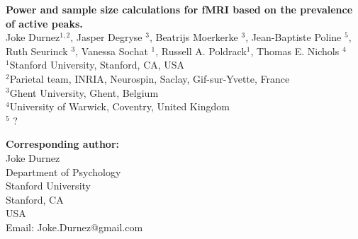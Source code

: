 \begin{titlepage}
\vspace*{0cm}
{\sffamily
\vfill
\begin{center}

{\huge \bfseries Power and sample size calculations for fMRI based on the prevalence of active peaks.}\\[1cm]

{\large Joke Durnez$^{1,2}$, Jasper Degryse $^3$, Beatrijs Moerkerke $^3$, Jean-Baptiste Poline $^5$, Ruth Seurinck $^3$, Vanessa Sochat $^1$, Russell A. Poldrack$^1$, Thomas E. Nichols $^4$}\\
$^1$Stanford University, Stanford, CA, USA \\
$^2$Parietal team, INRIA, Neurospin, Saclay, Gif-sur-Yvette, France \\
$^3$Ghent University, Ghent, Belgium\\
$^4$University of Warwick, Coventry, United Kingdom \\
$^5$ ?
\end{center}


\vfill

{\bfseries Corresponding author:}\\
Joke Durnez\\
Department of Psychology\\
Stanford University\\
Stanford, CA\\
USA\\
Email: Joke.Durnez@gmail.com
}\end{titlepage}
